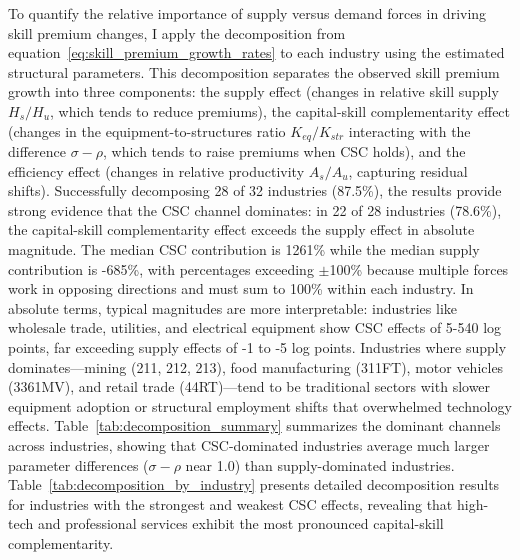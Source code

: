 \documentclass[12pt]{article}
\begin{document}
To quantify the relative importance of supply versus demand forces in driving skill premium changes, I apply the decomposition from equation~\eqref{eq:skill_premium_growth_rates} to each industry using the estimated structural parameters. This decomposition separates the observed skill premium growth into three components: the supply effect (changes in relative skill supply $H_s/H_u$, which tends to reduce premiums), the capital-skill complementarity effect (changes in the equipment-to-structures ratio $K_{eq}/K_{str}$ interacting with the difference $\sigma - \rho$, which tends to raise premiums when CSC holds), and the efficiency effect (changes in relative productivity $A_s/A_u$, capturing residual shifts). Successfully decomposing 28 of 32 industries (87.5\%), the results provide strong evidence that the CSC channel dominates: in 22 of 28 industries (78.6\%), the capital-skill complementarity effect exceeds the supply effect in absolute magnitude. The median CSC contribution is 1261\% while the median supply contribution is -685\%, with percentages exceeding $\pm$100\% because multiple forces work in opposing directions and must sum to 100\% within each industry. In absolute terms, typical magnitudes are more interpretable: industries like wholesale trade, utilities, and electrical equipment show CSC effects of 5-540 log points, far exceeding supply effects of -1 to -5 log points. Industries where supply dominates---mining (211, 212, 213), food manufacturing (311FT), motor vehicles (3361MV), and retail trade (44RT)---tend to be traditional sectors with slower equipment adoption or structural employment shifts that overwhelmed technology effects. Table~\ref{tab:decomposition_summary} summarizes the dominant channels across industries, showing that CSC-dominated industries average much larger parameter differences ($\sigma - \rho$ near 1.0) than supply-dominated industries. Table~\ref{tab:decomposition_by_industry} presents detailed decomposition results for industries with the strongest and weakest CSC effects, revealing that high-tech and professional services exhibit the most pronounced capital-skill complementarity.





\end{document}
